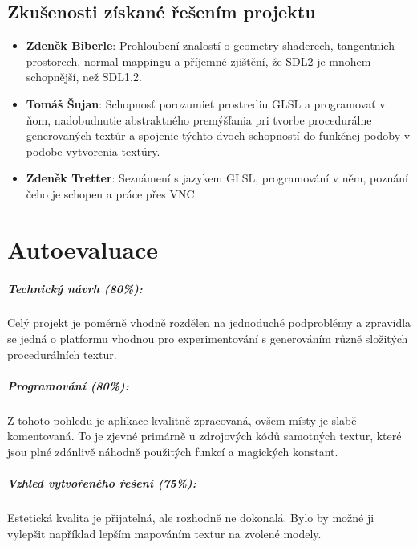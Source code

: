 \documentclass[12pt,a4paper,titlepage,final]{report}
\newcommand\AuthorA{Zdeněk Biberle}
\newcommand\AuthorB{Tomáš Šujan}
\newcommand\AuthorC{Zdeněk Tretter}
\begin{document}
\section{Zkušenosti získané řešením projektu}

\begin{itemize}
\item \textbf{\AuthorA}: Prohloubení znalostí o geometry shaderech, tangentních prostorech, normal mappingu a příjemné zjištění, že SDL2 je mnohem schopnější, než SDL1.2.
\item \textbf{\AuthorB}: Schopnosť porozumieť prostrediu GLSL a programovať v ňom, nadobudnutie abstraktného premýšľania pri tvorbe procedurálne generovaných textúr a spojenie týchto dvoch schopností do funkčnej podoby v podobe vytvorenia textúry. 
\item \textbf{\AuthorC}: Seznámení s jazykem GLSL, programování v něm, poznání čeho je schopen a práce přes VNC.
\end{itemize}

\chapter{Autoevaluace}

\paragraph{Technický návrh (80\%):} Celý projekt je poměrně vhodně rozdělen na jednoduché podproblémy a zpravidla se jedná o platformu vhodnou pro experimentování s generováním různě složitých procedurálních textur.

\paragraph{Programování (80\%):} Z tohoto pohledu je aplikace kvalitně zpracovaná, ovšem místy je slabě komentovaná. To je zjevné primárně u zdrojových kódů samotných textur, které jsou plné zdánlivě náhodně použitých funkcí a magických konstant.

\paragraph{Vzhled vytvořeného řešení (75\%):} Estetická kvalita je přijatelná, ale rozhodně ne dokonalá. Bylo by možné ji vylepšit například lepším mapováním textur na zvolené modely.
\end{document}
